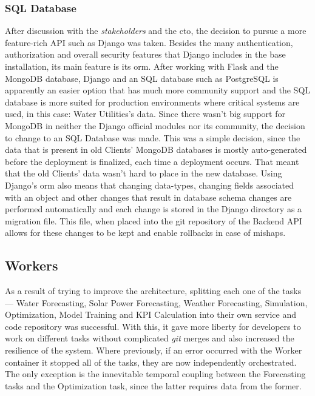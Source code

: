 \subsubsection{SQL Database}\label{methodology:sss:sql-database}
After discussion with the \textit{stakeholders} and the \gls{cto}, the decision to pursue a more feature-rich API such as Django was taken. Besides the many authentication, authorization and overall security features that Django includes in the base installation, its main feature is its \gls{orm}. After working with Flask and the MongoDB database, Django and an SQL database such as PostgreSQL is apparently an easier option that has much more community support and the SQL database is more suited for production environments where critical systems are used, in this case: Water Utilities's data. Since there wasn't big support for MongoDB in neither the Django official modules nor its community, the decision to change to an SQL Database was made. This was a simple decision, since the data that is present in old Clients' MongoDB databases is mostly auto-generated before the deployment is finalized, each time a deployment occurs. That meant that the old Clients' data wasn't hard to place in the new database.
Using Django's \gls{orm} also means that changing data-types, changing fields associated with an object and other changes that result in database schema changes are performed automatically and each change is stored in the Django directory as a migration file. This file, when placed into the git repository of the Backend API allows for these changes to be kept and enable rollbacks in case of mishaps.

\subsection{Workers}\label{methodology:ss:workers}

As a result of trying to improve the architecture, splitting each one of the tasks --- Water Forecasting, Solar Power Forecasting, Weather Forecasting, Simulation, Optimization, Model Training and KPI Calculation into their own service and code repository was successful. With this, it gave more liberty for developers to work on different tasks without complicated \textit{git} merges and also increased the resilience of the system. Where previously, if an error occurred with the Worker container it stopped all of the tasks, they are now independently orchestrated. The only exception is the innevitable temporal coupling between the Forecasting tasks and the Optimization task, since the latter requires data from the former.

